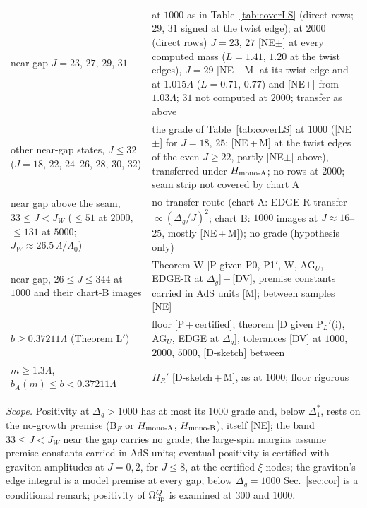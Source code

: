 \documentclass[aps,prl,onecolumn,superscriptaddress,nofootinbib]{revtex4-2}
\begin{document}
\begin{table}[!htbp]
\begin{ruledtabular}
\begin{tabular}{L{5.6cm}L{10.8cm}}
near gap $J=23$, $27$, $29$, $31$ & at $1000$ as in Table~\ref{tab:coverLS} (direct rows; $29$, $31$ signed at the twist edge);
at $2000$ (direct rows) $J=23$, $27$ [NE$\pm$] at every computed mass ($L=1.41$, $1.20$ at the twist edges), $J=29$ [NE\,+\,M] at its
twist edge and at $1.015\Lambda$ ($L=0.71$, $0.77$) and [NE$\pm$] from $1.03\Lambda$; $31$ not computed at $2000$; transfer as above\\
other near-gap states, $J\le32$ ($J=18$, $22$, $24$--$26$, $28$, $30$, $32$) & the grade of Table~\ref{tab:coverLS} at $1000$
([NE$\pm$] for $J=18$, $25$; [NE\,+\,M] at the twist edges of the even $J\ge22$, partly [NE$\pm$] above), transferred under
$H_{\rm mono\text{-}A}$; no rows at $2000$; seam strip not covered by chart A\\
near gap above the seam, $33\le J<J_W$ ($\le51$ at $2000$, $\le131$ at $5000$; $J_W\approx26.5\,\Lambda/\Lambda_0$) & no transfer route
(chart A: EDGE-R transfer $\propto(\Delta_g/J)^2$; chart B: $1000$ images at $J\approx16$--$25$, mostly [NE\,+\,M]); no grade (hypothesis only)\\
near gap, $26\le J\le344$ at $1000$ and their chart-B images & Theorem W [P given P0, P1$'$, W, AG$_U$, EDGE-R at $\Delta_g$]\,+\,[DV],
premise constants carried in AdS units [M]; between samples [NE]\\
$b\ge0.37211\Lambda$ (Theorem L$'$) & floor [P\,+\,certified]; theorem [D given P$_L'$(i), AG$_U$, EDGE at $\Delta_g$], tolerances [DV]
at $1000$, $2000$, $5000$, [D-sketch] between\\
$m\ge1.3\Lambda$, $b_A(m)\le b<0.37211\Lambda$ & $H_R'$ [D-sketch\,+\,M], as at $1000$; floor rigorous\\
\end{tabular}
\end{ruledtabular}
\end{table}

\emph{Scope.} Positivity at $\Delta_g>1000$ has at most its $1000$ grade and, below $\Delta_1^*$, rests on the no-growth premise (B$_F$ or $H_{\rm mono\text{-}A}$, $H_{\rm mono\text{-}B}$), itself [NE]; the band $33\le J<J_W$ near the gap carries no grade; the large-spin margins assume premise constants carried in AdS units; eventual positivity is certified with graviton amplitudes at $J=0,2$, for $J\le8$, at the certified $\xi$ nodes; the graviton's edge integral is a model premise at every gap; below $\Delta_g=1000$ Sec.~\ref{sec:cor} is a conditional remark; positivity of $\Omega^Q_{\rm up}$ is examined at $300$ and $1000$.
\end{document}
